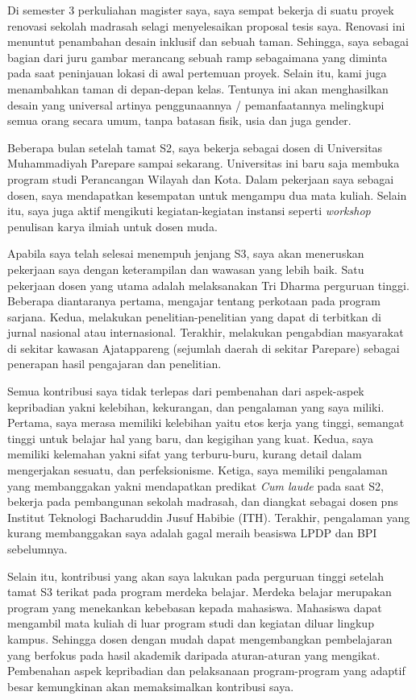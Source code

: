 \documentclass[../main.tex]{subfiles}
\begin{document}
Di semester 3 perkuliahan magister saya, saya sempat bekerja di suatu proyek renovasi sekolah madrasah selagi menyelesaikan proposal tesis saya. Renovasi ini menuntut penambahan desain inklusif dan sebuah taman. Sehingga, saya sebagai bagian dari juru gambar merancang sebuah ramp sebagaimana yang diminta pada saat peninjauan lokasi di awal pertemuan proyek. Selain itu, kami juga menambahkan taman di depan-depan kelas. Tentunya ini akan menghasilkan desain yang universal artinya penggunaannya / pemanfaatannya melingkupi semua orang secara umum, tanpa batasan fisik, usia dan juga gender.

Beberapa bulan setelah tamat S2, saya bekerja sebagai dosen di Universitas Muhammadiyah Parepare sampai sekarang. Universitas ini baru saja membuka program studi Perancangan Wilayah dan Kota. Dalam pekerjaan saya sebagai dosen, saya mendapatkan kesempatan untuk mengampu dua mata kuliah. Selain itu, saya juga aktif mengikuti kegiatan-kegiatan instansi seperti \textit{workshop} penulisan karya ilmiah untuk dosen muda.

Apabila saya telah selesai menempuh jenjang S3, saya akan meneruskan pekerjaan saya dengan keterampilan dan wawasan yang lebih baik. Satu pekerjaan dosen yang utama adalah melaksanakan Tri Dharma perguruan tinggi. Beberapa diantaranya pertama, mengajar tentang perkotaan pada program sarjana. Kedua, melakukan penelitian-penelitian yang dapat di terbitkan di jurnal nasional atau internasional. Terakhir, melakukan pengabdian masyarakat di sekitar kawasan Ajatappareng (sejumlah daerah di sekitar Parepare) sebagai penerapan hasil pengajaran dan penelitian.

Semua kontribusi saya tidak terlepas dari pembenahan dari aspek-aspek kepribadian yakni kelebihan, kekurangan, dan pengalaman yang saya miliki. Pertama, saya merasa memiliki kelebihan yaitu etos kerja yang tinggi, semangat tinggi untuk belajar hal yang baru, dan kegigihan yang kuat. Kedua, saya memiliki kelemahan yakni sifat yang terburu-buru, kurang detail dalam mengerjakan sesuatu, dan perfeksionisme. Ketiga, saya memiliki pengalaman yang membanggakan yakni mendapatkan predikat \textit{Cum laude} pada saat S2, bekerja pada pembangunan sekolah madrasah, dan diangkat sebagai dosen pns Institut Teknologi Bacharuddin Jusuf Habibie (ITH). Terakhir, pengalaman yang kurang membanggakan saya adalah gagal meraih beasiswa LPDP dan BPI sebelumnya.

Selain itu, kontribusi yang akan saya lakukan pada perguruan tinggi setelah tamat S3 terikat pada program merdeka belajar. Merdeka belajar merupakan program yang menekankan kebebasan kepada mahasiswa. Mahasiswa dapat mengambil mata kuliah di luar program studi dan kegiatan diluar lingkup kampus. Sehingga dosen dengan mudah dapat mengembangkan pembelajaran yang berfokus pada hasil akademik daripada aturan-aturan yang mengikat. Pembenahan aspek kepribadian dan pelaksanaan program-program yang adaptif besar kemungkinan akan memaksimalkan kontribusi saya.
\end{document}
